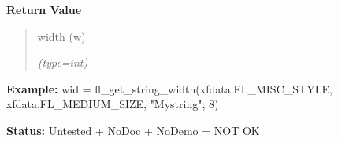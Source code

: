 \begin{boxedminipage}{\funcwidth}
      \textbf{Return Value}
    \vspace{-1ex}

      \begin{quote}
      width (w)

      {\it (type=int)}

      \end{quote}

\textbf{Example:} wid = fl\_get\_string\_width(xfdata.FL\_MISC\_STYLE, 
xfdata.FL\_MEDIUM\_SIZE, "Mystring", 8)



\textbf{Status:} Untested + NoDoc + NoDemo = NOT OK



    \end{boxedminipage}

    \label{xformslib:flbasic:fl_get_string_dimension}

    \vspace{0.5ex}

